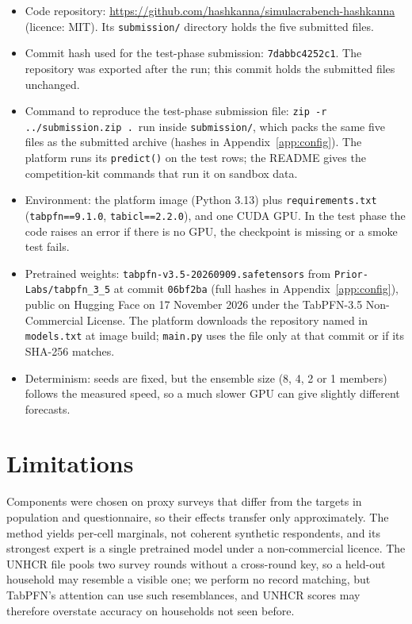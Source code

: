 \documentclass{article}
\newcommand{\coderepo}{\url{https://github.com/hashkanna/simulacrabench-hashkanna}}
\newcommand{\codecommitshort}{7dabbc4252c1}
\begin{document}
\begin{itemize}[leftmargin=*,itemsep=1pt,topsep=2pt]
  \item Code repository: \coderepo{} (licence: MIT). Its \texttt{submission/} directory holds
        the five submitted files.
  \item Commit hash used for the test-phase submission: \texttt{\codecommitshort}. The
        repository was exported after the run; this commit holds the submitted files unchanged.
  \item Command to reproduce the test-phase submission file:
        \texttt{zip -r ../submission.zip .}\ run inside \texttt{submission/}, which packs the same
        five files as the submitted archive (hashes in Appendix~\ref{app:config}). The platform
        runs its \texttt{predict()} on the test rows; the README gives the competition-kit
        commands that run it on sandbox data.
  \item Environment: the platform image (Python 3.13) plus \texttt{requirements.txt}
        (\texttt{tabpfn==9.1.0}, \texttt{tabicl==2.2.0}), and one CUDA GPU. In the test phase the
        code raises an error if there is no GPU, the checkpoint is missing or a smoke test fails.
  \item Pretrained weights: \texttt{tabpfn-v3.5-20260909.safetensors} from
        \texttt{Prior-Labs/tabpfn\_3\_5} at commit \texttt{06bf2ba} (full hashes in
        Appendix~\ref{app:config}), public on Hugging Face on 17 November 2026 under the
        TabPFN-3.5 Non-Commercial License. The platform downloads the repository named in
        \texttt{models.txt} at image build; \texttt{main.py} uses the file only at that commit or
        if its SHA-256 matches.
  \item Determinism: seeds are fixed, but the ensemble size (8, 4, 2 or 1 members) follows the
        measured speed, so a much slower GPU can give slightly different forecasts.
\end{itemize}

\section{Limitations}
\label{sec:limitations}

Components were chosen on proxy surveys that differ from the targets in population and
questionnaire, so their effects transfer only approximately. The method yields per-cell
marginals, not coherent synthetic respondents, and its strongest expert is a single pretrained
model under a non-commercial licence. The UNHCR file pools two survey rounds without a
cross-round key, so a held-out household may resemble a visible one; we perform no record
matching, but TabPFN's attention can use such resemblances, and UNHCR scores may therefore
overstate accuracy on households not seen before.\label{endmain}
\end{document}
